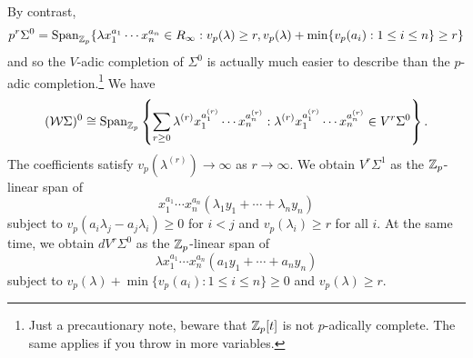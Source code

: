 \documentclass[11pt]{article}
\newcommand{\W}{\mathcal{W}}
\begin{document}
By contrast,
\begin{align*}
p^r\Sigma^0
=\operatorname{Span}_{\mathbb{Z}_p}\{\lambda x_1^{a_1}\cdots x_n^{a_n}\in R_{\infty} : v_p(\lambda)\geq r,v_p(\lambda)+\min\{v_p(a_i) : 1\leq i\leq n\}\geq r\}
\end{align*}
and so the $V$-adic completion of $\Sigma^0$ is actually much easier to describe than the $p$-adic completion.\footnote{Just a precautionary note, beware that $\mathbb{Z}_p[t]$ is not $p$-adically complete. The same applies if you throw in more variables.} We have
\begin{align*}
(\W\Sigma)^0
\iso\Span_{\Z_p}\left\{\sum_{r\geq0}\lambda^{(r)}x_1^{a_1^{(r)}}\cdots x_n^{a_n^{(r)}} : \lambda^{(r)}x_1^{a_1^{(r)}}\cdots x_n^{a_n^{(r)}}\in V^r\Sigma^0\right\}.
\end{align*}
The coefficients satisfy $v_p(\lambda^{(r)})\to\infty$ as $r\to\infty$. We obtain $V^r\Sigma^1$ as the $\mathbb{Z}_p$-linear span of 
$$x_1^{a_1}\cdots x_n^{a_n}(\lambda_1y_1+\cdots+\lambda_ny_n)$$
subject to $v_p(a_i\lambda_j-a_j\lambda_i)\geq0$ for $i<j$ and $v_p(\lambda_i)\geq r$ for all $i$. At the same time, we obtain $dV^r\Sigma^0$ as the $\mathbb{Z}_p$-linear span of 
$$\lambda x_1^{a_1}\cdots x_n^{a_n}(a_1y_1+\cdots+a_ny_n)$$
subject to $v_p(\lambda)+\min\{v_p(a_i) : 1\leq i\leq n\}\geq0$ and $v_p(\lambda)\geq r$.
\end{document}
